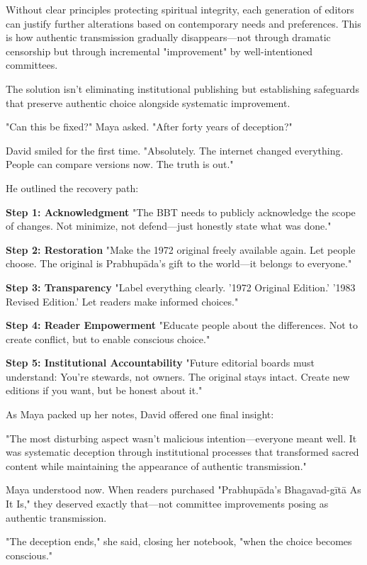 \documentclass[12pt,twoside]{book}
\begin{document}
Without clear principles protecting spiritual integrity, each generation of editors can justify further alterations based on contemporary needs and preferences. This is how authentic transmission gradually disappears—not through dramatic censorship but through incremental "improvement" by well-intentioned committees.

The solution isn't eliminating institutional publishing but establishing safeguards that preserve authentic choice alongside systematic improvement.

"Can this be fixed?" Maya asked. "After forty years of deception?"

David smiled for the first time. "Absolutely. The internet changed everything. People can compare versions now. The truth is out."

He outlined the recovery path:

\textbf{\textbf{Step 1: Acknowledgment}}
"The BBT needs to publicly acknowledge the scope of changes. Not minimize, not defend—just honestly state what was done."

\textbf{\textbf{Step 2: Restoration}}
"Make the 1972 original freely available again. Let people choose. The original is Prabhupāda's gift to the world—it belongs to everyone."

\textbf{\textbf{Step 3: Transparency}}
"Label everything clearly. '1972 Original Edition.' '1983 Revised Edition.' Let readers make informed choices."

\textbf{\textbf{Step 4: Reader Empowerment}}
"Educate people about the differences. Not to create conflict, but to enable conscious choice."

\textbf{\textbf{Step 5: Institutional Accountability}}
"Future editorial boards must understand: You're stewards, not owners. The original stays intact. Create new editions if you want, but be honest about it."

As Maya packed up her notes, David offered one final insight:

"The most disturbing aspect wasn't malicious intention—everyone meant well. It was systematic deception through institutional processes that transformed sacred content while maintaining the appearance of authentic transmission."

Maya understood now. When readers purchased "Prabhupāda's Bhagavad-gītā As It Is," they deserved exactly that—not committee improvements posing as authentic transmission.

"The deception ends," she said, closing her notebook, "when the choice becomes conscious."
\end{document}
